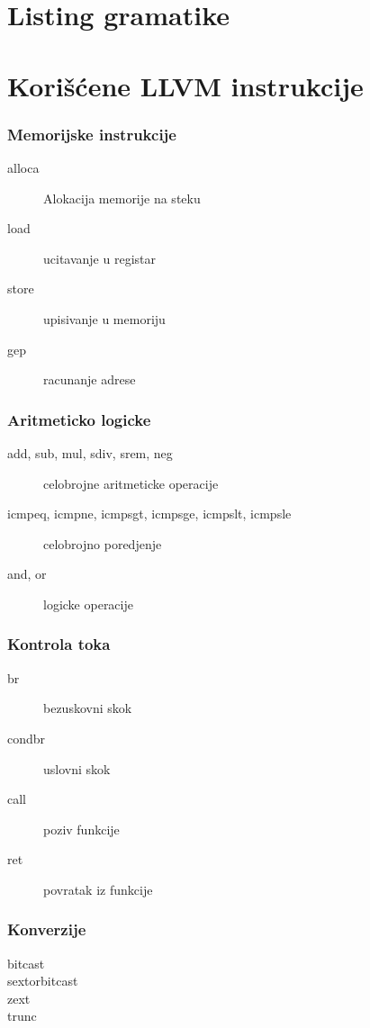 
\appendix

\chapter{Listing gramatike}
\lstset{
  basicstyle=\footnotesize
}



\chapter{Korišćene LLVM instrukcije}

\subsection*{Memorijske instrukcije}

\begin{description}
\item[alloca] Alokacija memorije na steku
\item[load] ucitavanje u registar
\item[store] upisivanje u memoriju
\item[gep] racunanje adrese
\end{description}

\subsection*{Aritmeticko logicke}

\begin{description}
\item[add, sub, mul, sdiv, srem, neg] celobrojne aritmeticke operacije
\item[icmpeq, icmpne, icmpsgt, icmpsge, icmpslt, icmpsle] celobrojno poredjenje
\item[and, or] logicke operacije
\end{description}

\subsection*{Kontrola toka}

\begin{description}
\item[br] bezuskovni skok
\item[condbr] uslovni skok
\item[call] poziv funkcije
\item[ret] povratak iz funkcije
\end{description}

\subsection*{Konverzije}

\begin{description}
\item[bitcast]
\item[sextorbitcast]
\item[zext]
\item[trunc]
\end{description}
